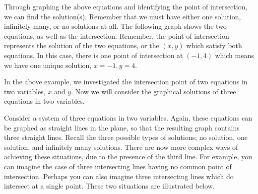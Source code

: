 \begin{solution} Through graphing the above equations and identifying the point of intersection, we can find the solution(s). Remember that we must have either one solution, infinitely many, or no solutions at all. 
 The following graph shows the two equations,
as well as the intersection. Remember, the point of intersection represents the solution of
the two equations, or the $\left( x,y\right)$ which satisfy both equations. In this case,
there is one point of intersection at $\left( -1, 4 \right)$ which means we have one unique solution, $x = -1, y = 4$.

\begin{center}
\par{}\label{fig:systemsofequationsGeometry-tikz02}%

\end{center}
\end{solution}

In the above example, we investigated the intersection point of two equations in two variables, $x$ and $y$. Now we will consider 
the graphical solutions of three equations in two variables.

Consider a system of three equations in two variables. Again, these equations can be graphed as
straight lines in the plane, so that the resulting graph contains three straight lines. Recall the three possible types of solutions; no solution, one solution, and infinitely many solutions.
There are now more complex ways of achieving these situations, due to the presence of the third line. For example, you can imagine the case of three intersecting
lines having no common point of intersection. Perhaps you can also imagine three intersecting lines
which do intersect at a single point. These two situations are illustrated below. 

